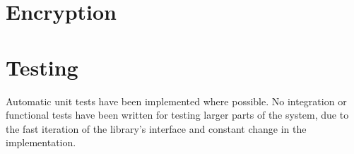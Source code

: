 \section{Encryption}


\section{Testing}
\label{sec:testing}
Automatic unit tests have been implemented where possible. No integration or functional tests have been written for testing larger parts of the system, due to the fast iteration of the library's interface and constant change in the implementation.

